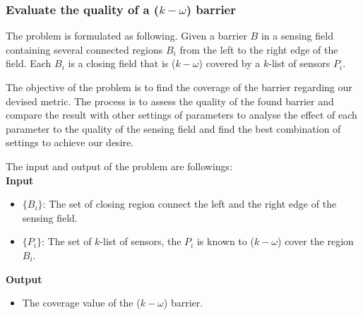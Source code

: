 \subsubsection{Evaluate the quality of a ($k-\omega$) barrier}
The problem is formulated as following. Given a barrier $B$ in a sensing field containing several connected regions $B_i$ from the left to the right edge of the field. Each $B_i$ is a closing field that is ($k-\omega$) covered by a $k$-list of sensors $P_i$.

The objective of the problem is to find the coverage of the barrier regarding our devised metric. The process is to assess the quality of the found barrier and compare the result with other settings of parameters to analyse the effect of each parameter to the quality of the sensing field and find the best combination of settings to achieve our desire.

\noindent The input and output of the problem are followings:\\[7pt]
{\bfseries Input}
\begin{itemize}
	\item $\{B_i\}$: The set of closing region connect the left and the right edge of the sensing field.
	\item $\{P_i\}$: The set of $k$-list of sensors, the $P_i$ is known to ($k-\omega$) cover the region $B_i$.
\end{itemize}
{\bfseries Output}
\begin{itemize}
	\item The coverage value of the ($k-\omega$) barrier.
\end{itemize}